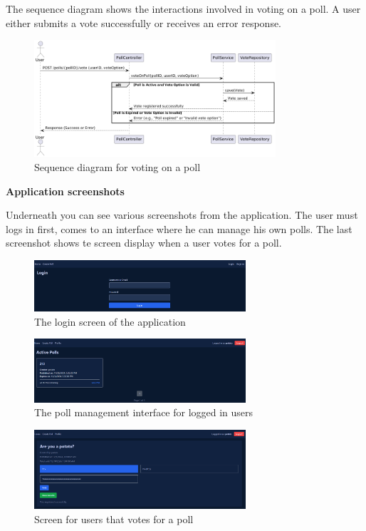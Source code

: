 \vspace{0.2cm}
\noindent The sequence diagram shows the interactions involved in voting on a poll. A user either submits a vote successfully or receives an error response.

\begin{figure}[H]
	\centering
	\includegraphics[width=0.8\textwidth]{../images/SequenceDiagramVotingLogic.png}
	\caption{Sequence diagram for voting on a poll}
	\label{fig:sequence_diagram}
\end{figure}

\noindent \textbf{Application screenshots}

\vspace{0.2cm}
\noindent Underneath you can see various screenshots from the application. The user must logs in first, comes to an interface where he can manage his own polls. The last screenshot shows te screen display when a user votes for a poll.

\begin{figure}[H]
	\centering
	\includegraphics[width=0.7\textwidth]{../images/login.png}
	\caption{The login screen of the application}
	\label{fig:Login sceen}
\end{figure}
\begin{figure}[H]
	\centering
	\includegraphics[width=0.7\textwidth]{../images/loggedInDashboard.png}
	\caption{The poll management interface for logged in users}
	\label{fig:Poll management interface}
\end{figure}
\begin{figure}[H]
	\centering
	\includegraphics[width=0.7\textwidth]{../images/votingScreen.png}
	\caption{Screen for users that votes for a poll}
	\label{fig: Voting for poll}
\end{figure}



